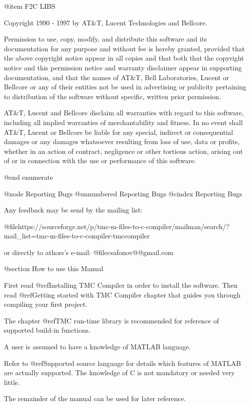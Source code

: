 @item F2C LIBS


Copyright 1990 - 1997 by AT&T, Lucent Technologies and Bellcore.

Permission to use, copy, modify, and distribute this software
and its documentation for any purpose and without fee is hereby
granted, provided that the above copyright notice appear in all
copies and that both that the copyright notice and this
permission notice and warranty disclaimer appear in supporting
documentation, and that the names of AT&T, Bell Laboratories,
Lucent or Bellcore or any of their entities not be used in
advertising or publicity pertaining to distribution of the
software without specific, written prior permission.

AT&T, Lucent and Bellcore disclaim all warranties with regard to
this software, including all implied warranties of
merchantability and fitness.  In no event shall AT&T, Lucent or
Bellcore be liable for any special, indirect or consequential
damages or any damages whatsoever resulting from loss of use,
data or profits, whether in an action of contract, negligence or
other tortious action, arising out of or in connection with the
use or performance of this software.


@end enumerate




@node Reporting Bugs
@unnumbered Reporting Bugs
@cindex Reporting Bugs

Any feedback may be send by the mailing list:

@file{https://sourceforge.net/p/tmc-m-files-to-c-compiler/mailman/search/?mail_list=tmc-m-files-to-c-compiler-tmccompiler}

or directly to athors's e-mail: @file{csafonov@@gmail.com}

@section How to use this Manual

First read @ref{Installing TMC Compiler} in order to install the software. Then read @ref{Getting started with TMC Compiler} chapter that guides you through compiling your first project.

The chapter @ref{TMC run-time library} is recommended for reference of supported build-in functions. 

A user is assumed to have a knowledge of MATLAB language. 


Refer to @ref{Supported source language} for details which features of MATLAB are actually supported.
The knowledge of C is not mandatory or needed very little. 

The remainder of the manual can be used for later reference.  




